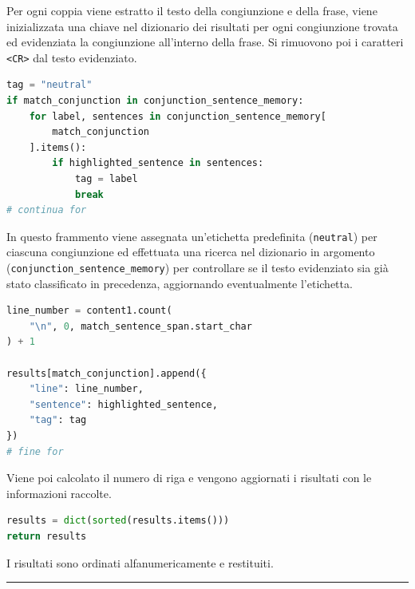 \documentclass[12pt]{report}
\begin{document}
Per ogni coppia viene estratto il testo della congiunzione e della frase, viene inizializzata una chiave nel dizionario dei risultati per ogni congiunzione trovata ed evidenziata la congiunzione all'interno della frase. Si rimuovono poi i caratteri \texttt{<CR>} dal testo evidenziato.


\begin{mdframed}
\small
\begin{lstlisting}[language=Python]
tag = "neutral"
if match_conjunction in conjunction_sentence_memory:
    for label, sentences in conjunction_sentence_memory[
        match_conjunction
    ].items():
        if highlighted_sentence in sentences:
            tag = label
            break
# continua for
\end{lstlisting}
\end{mdframed}

\noindent In questo frammento viene assegnata un'etichetta predefinita (\texttt{neutral}) per ciascuna congiunzione ed effettuata una ricerca nel dizionario in argomento (\texttt{conjunction\_sentence\_memory}) per controllare se il testo evidenziato sia già stato classificato in precedenza, aggiornando eventualmente l'etichetta.


\begin{mdframed}
\small
\begin{lstlisting}[language=Python]
line_number = content1.count(
    "\n", 0, match_sentence_span.start_char
) + 1

results[match_conjunction].append({
    "line": line_number,
    "sentence": highlighted_sentence,
    "tag": tag
})
# fine for
\end{lstlisting}
\end{mdframed}

\noindent Viene poi calcolato il numero di riga e vengono aggiornati i risultati con le informazioni raccolte.


\begin{mdframed}
\small
\begin{lstlisting}[language=Python]
results = dict(sorted(results.items()))
return results
\end{lstlisting}
\end{mdframed}

\noindent I risultati sono ordinati alfanumericamente e restituiti.


{\centering \rule{0.5\linewidth}{0.1pt} \par\vspace{0.25cm}}
\end{document}

